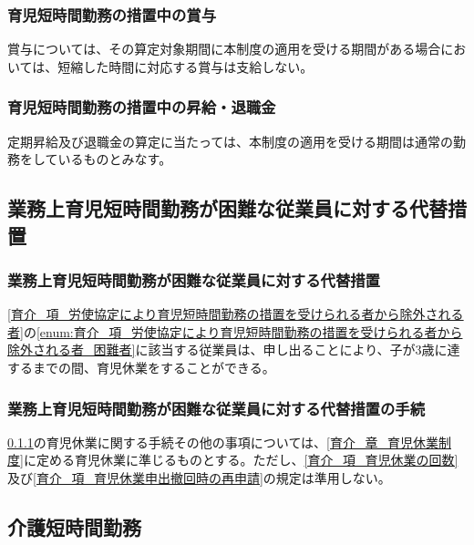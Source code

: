 \documentclass{jsarticle}
\begin{document}
\subsubsection{育児短時間勤務の措置中の賞与}
\label{育介_項_育児短時間勤務の措置中の賞与}
賞与については、その算定対象期間に本制度の適用を受ける期間がある場合においては、短縮した時間に対応する賞与は支給しない。

\subsubsection{育児短時間勤務の措置中の昇給・退職金}
\label{育介_項_育児短時間勤務の措置中の昇給・退職金}
定期昇給及び退職金の算定に当たっては、本制度の適用を受ける期間は通常の勤務をしているものとみなす。

\subsection{業務上育児短時間勤務が困難な従業員に対する代替措置}
\label{育介_条_業務上育児短時間勤務が困難な従業員に対する代替措置}

\subsubsection{業務上育児短時間勤務が困難な従業員に対する代替措置}
\label{育介_項_業務上育児短時間勤務が困難な従業員に対する代替措置}
\ref{育介_項_労使協定により育児短時間勤務の措置を受けられる者から除外される者}の\ref{enum:育介_項_労使協定により育児短時間勤務の措置を受けられる者から除外される者_困難者}に該当する従業員は、申し出ることにより、子が3歳に達するまでの間、育児休業をすることができる。

\subsubsection{業務上育児短時間勤務が困難な従業員に対する代替措置の手続}
\label{育介_項_業務上育児短時間勤務が困難な従業員に対する代替措置の手続}
\ref{育介_項_業務上育児短時間勤務が困難な従業員に対する代替措置}の育児休業に関する手続その他の事項については、\ref{育介_章_育児休業制度}に定める育児休業に準じるものとする。ただし、\ref{育介_項_育児休業の回数}及び\ref{育介_項_育児休業申出撤回時の再申請}の規定は準用しない。

\subsection{介護短時間勤務}
\label{育介_条_介護短時間勤務}
\end{document}
